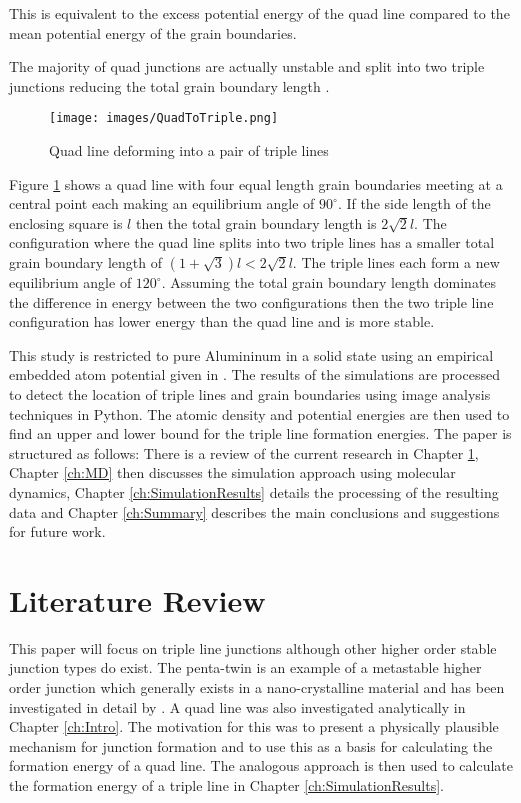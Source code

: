 \documentclass[12pt,a4paper,openany]{report}
\begin{document}
This is equivalent to the excess potential energy of the quad line compared to the mean potential energy of the grain boundaries.

The majority of quad junctions are actually unstable and split into two triple junctions reducing the total grain boundary length \cite{Lazar2011,Kinderlehrer2006}.  

\begin{figure}[H]
	\centering
	\texttt{[image: images/QuadToTriple.png]} 
	\label{fig:QuadToTriple}
	\caption{Quad line deforming into a pair of triple lines}
\end{figure}

Figure \ref{fig:QuadToTriple} shows a quad line with four equal length grain boundaries meeting at a central point each making an equilibrium angle of $90^{\circ}$. If the side length of the enclosing square is $l$ then the total grain boundary length is $2\sqrt{2}l$. The configuration where the quad line splits into two triple lines has a smaller total grain boundary length of $(1 + \sqrt{3})l < 2\sqrt{2}l$. The triple lines each form a new equilibrium angle of $120^{\circ}$. Assuming the total grain boundary length dominates the difference in energy between the two configurations then the two triple line configuration has lower energy than the quad line and is more stable. 


This study is restricted to pure Alumininum in a solid state using an empirical embedded atom potential given in \cite{Zope2003}. The results of the simulations are processed to detect the location of triple lines and grain boundaries using image analysis techniques in Python. The atomic density and potential energies are then used to find an upper and lower bound for the triple line formation energies. The paper is structured as follows: There is a review of the current research in Chapter \ref{ch:lr}, Chapter \ref{ch:MD} then discusses the simulation approach using molecular dynamics, Chapter \ref{ch:SimulationResults} details the processing of the resulting data and Chapter \ref{ch:Summary} describes the main conclusions and suggestions for future work.   


\chapter{Literature Review} \label{ch:lr}

This paper will focus on triple line junctions although other higher order stable junction types do exist. The penta-twin is an example of a metastable higher order junction which generally exists in a nano-crystalline material and has been investigated in detail by \cite{Thomas2016}. A quad line was also investigated analytically in Chapter \ref{ch:Intro}. The motivation for this was to present a physically plausible mechanism for junction formation and to use this as a basis for calculating the formation energy of a quad line. The analogous approach is then used to calculate the formation energy of a triple line in Chapter \ref{ch:SimulationResults}. 
\end{document}
